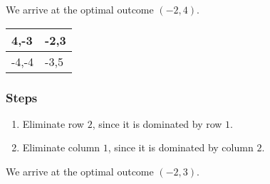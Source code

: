 \documentclass{article}
\begin{document}
We arrive at the optimal outcome $(-2, 4)$.
\newpage
\begin{table}[]
\centering
\begin{tabular}{|l|l|}
\hline4,-3 & -2,3\\ \hline
-4,-4 & -3,5\\ \hline
\end{tabular}
\end{table}\subsubsection*{Steps}
\begin{enumerate}
\item Eliminate row $2$, since it is dominated by row $1$.
\item Eliminate column $1$, since it is dominated by column $2$.
\end{enumerate}
We arrive at the optimal outcome $(-2, 3)$.
\newpage
\end{document}
